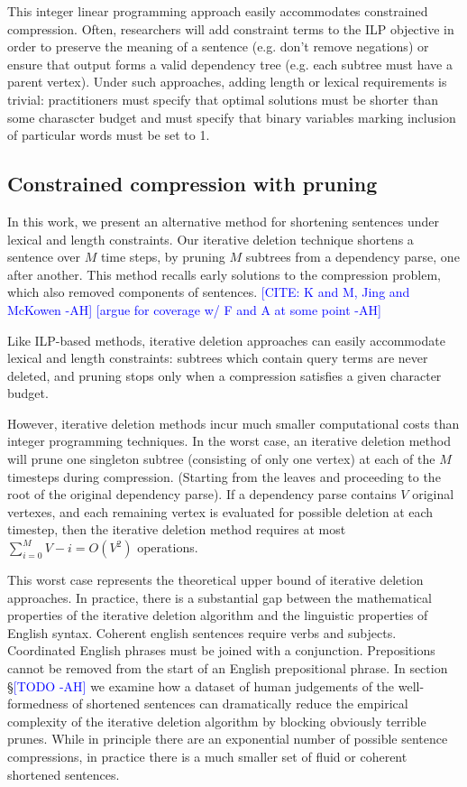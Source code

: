 \documentclass[11pt,a4paper]{article}
\newcommand{\ahcomment}[1]{\textcolor{blue}{[#1 -AH]}}
\begin{document}
This integer linear programming approach easily accommodates constrained compression. Often, researchers will add constraint terms to the ILP objective in order to preserve the meaning of a sentence (e.g. don't remove negations) or ensure that output forms a valid dependency tree (e.g. each subtree must have a parent vertex). Under such approaches, adding length or lexical requirements is trivial: practitioners must specify that optimal solutions must be shorter than some charascter budget and must specify that binary variables marking inclusion of particular words must be set to 1. 

\subsection{Constrained compression with pruning}

In this work, we present an alternative method for shortening sentences under lexical and length constraints. Our iterative deletion technique shortens a sentence over $M$ time steps, by pruning $M$ subtrees from a dependency parse, one after another. This method recalls early solutions to the compression problem, which also removed components of sentences. \ahcomment{CITE: K and M, Jing  and McKowen} \ahcomment{argue for coverage w/ F and A at some point}

Like ILP-based methods, iterative deletion approaches can easily accommodate lexical and length constraints: subtrees which contain query terms are never deleted, and pruning stops only when a compression satisfies a given character budget. 

However, iterative deletion methods incur much smaller computational costs than integer programming techniques. In the worst case, an iterative deletion method will prune one singleton subtree (consisting of only one vertex) at each of the $M$ timesteps during compression. (Starting from the leaves and proceeding to the root of the original dependency parse). If a dependency parse contains $V$ original vertexes, and each remaining vertex is evaluated for possible deletion at each timestep, then the iterative deletion method requires at most ${\sum_{i = 0}^M V - i = O(V^2)}$ operations.

This worst case represents the theoretical upper bound of iterative deletion approaches. In practice, there is a substantial gap between the mathematical properties of the iterative deletion algorithm and the linguistic properties of English syntax. Coherent english sentences require verbs and subjects. Coordinated English phrases must be joined with a conjunction. Prepositions cannot be removed from the start of an English prepositional phrase. In section \S\ahcomment{TODO} we examine how a dataset of human judgements of the well-formedness of shortened sentences can dramatically reduce the empirical complexity of the iterative deletion algorithm by blocking obviously terrible prunes. While in principle there are an exponential number of possible sentence compressions, in practice there is a much smaller set of fluid or coherent shortened sentences. 
\end{document}
